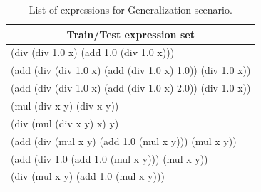 \documentclass[fullpage,twocolumn]{article} %
\begin{document}
\begin{table}
  \centering
  \caption{List of expressions for Generalization scenario.}
  \begin{tabular}{l}
  \toprule
        \multicolumn{1}{c}{{\bf Train/Test expression set}} \\ \midrule
(div (div 1.0 x) (add 1.0 (div 1.0 x)))  \\
(add (div (div 1.0 x) (add (div 1.0 x) 1.0)) (div 1.0 x))  \\
(add (div (div 1.0 x) (add (div 1.0 x) 2.0)) (div 1.0 x))  \\
(mul (div x y) (div x y))  \\
(div (mul (div x y) x) y)  \\
(add (div (mul x y) (add 1.0 (mul x y))) (mul x y))  \\
(add (div 1.0 (add 1.0 (mul x y))) (mul x y))  \\
(div (mul x y) (add 1.0 (mul x y)))  \\
  \bottomrule
  \end{tabular}
  \label{tbl:standard-expressions}
\end{table}
        
\end{document}
